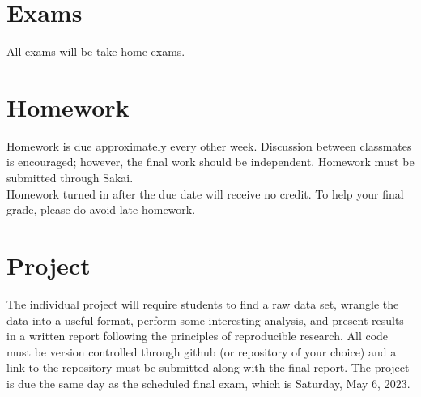 \documentclass{article}\usepackage[]{graphicx}\usepackage[]{color}
\begin{document}
\section*{Exams}
All exams will be take home exams.  

\section*{Homework}
Homework is due approximately every other week. Discussion between classmates is encouraged; however, the final work should be independent.  Homework must be submitted through Sakai.  \\

Homework turned in after the due date will receive no credit.  To help your final grade, please do avoid late homework.\\

\section*{Project}
The individual project will require students to find a raw data set, wrangle the data into a useful format, perform some interesting analysis, and present results in a written report following the principles of reproducible research.  All code must be version controlled through github (or repository of your choice) and a link to the repository must be submitted along with the final report.  The project is due the same day as the scheduled final exam, which is Saturday, May 6, 2023.  \\
\end{document}
